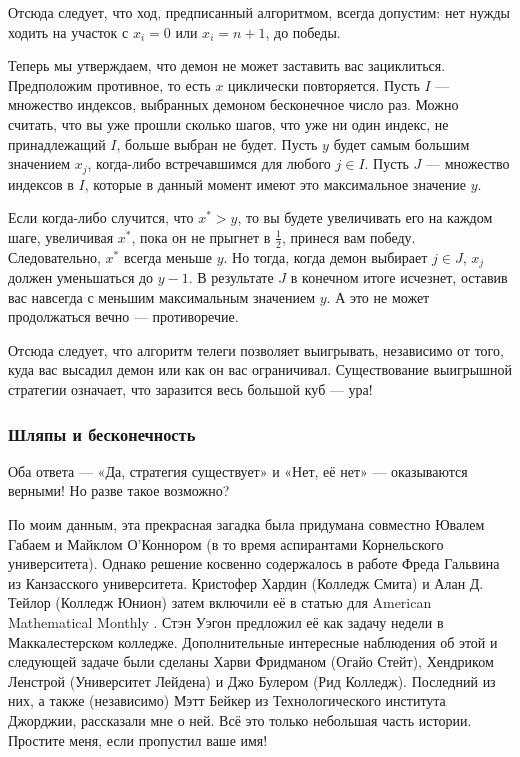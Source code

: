 Отсюда следует, что ход, предписанный алгоритмом, всегда допустим:
нет нужды ходить на участок с $x_i = 0$ или $x_i = n + 1$, до победы.

Теперь мы утверждаем, что демон не может заставить вас зациклиться.
Предположим противное, то есть $x$ циклически повторяется.
Пусть $I$ --- множество индексов, выбранных демоном бесконечное число раз.
Можно считать, что вы уже прошли сколько шагов, что уже ни один индекс, не принадлежащий $I$, больше выбран не будет.
Пусть $y$ будет самым большим значением $x_j$, когда-либо встречавшимся для любого $j \in I$.
Пусть $J$ --- множество индексов в $I$, которые в данный момент имеют это максимальное значение $y$.

Если когда-либо случится, что $x^* > y$, то вы будете увеличивать его на каждом шаге, увеличивая $x^*$, пока он не прыгнет в $\tfrac12$, принеся вам победу.
Следовательно, $x^*$ всегда меньше $y$.
Но тогда, когда демон выбирает $j \in J$, $x_j$ должен уменьшаться до $y - 1$.
В результате $J$ в конечном итоге исчезнет, оставив вас навсегда с меньшим максимальным значением $y$.
А это не может продолжаться вечно --- противоречие.

Отсюда следует, что алгоритм телеги позволяет выигрывать, независимо от того, куда вас высадил демон или как он вас ограничивал.
Существование выигрышной стратегии означает, что заразится весь большой куб --- ура!

\subsubsection*{Шляпы и бесконечность}

Оба ответа --- «Да, стратегия существует» и «Нет, её нет» --- оказываются верными!
Но разве такое возможно?

По моим данным, эта прекрасная загадка была придумана совместно Ювалем Габаем и Майклом О'Коннором (в то время аспирантами Корнельского университета).
Однако решение косвенно содержалось в работе Фреда Гальвина из Канзасского университета.
Кристофер Хардин (Колледж Смита) и Алан Д. Тейлор (Колледж Юнион) затем включили её в статью для American Mathematical Monthly \cite{36}.
Стэн Уэгон предложил её как задачу недели в Маккалестерском колледже.
Дополнительные интересные наблюдения об этой и следующей задаче были сделаны Харви Фридманом (Огайо Стейт), Хендриком Ленстрой (Университет Лейдена) и Джо Булером (Рид Колледж).
Последний из них, а также (независимо) Мэтт Бейкер из Технологического института Джорджии, рассказали мне о ней.
Всё это только небольшая часть истории.
Простите меня, если пропустил ваше имя!

